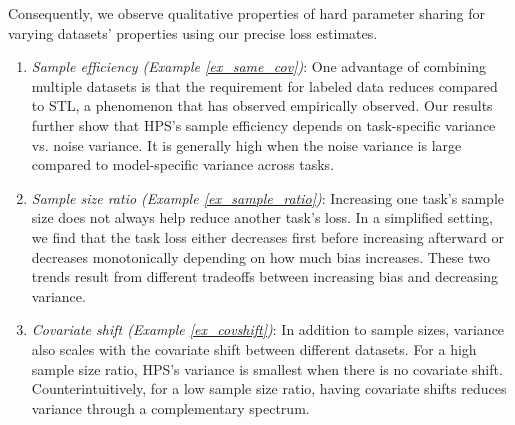 Consequently, we observe qualitative properties of hard parameter sharing for varying datasets' properties using our precise loss estimates.
\begin{enumerate}
	\item \textit{Sample efficiency (Example \ref{ex_same_cov})}:
	One advantage of combining multiple datasets is that the requirement for labeled data reduces compared to STL, a phenomenon that \citet{ZSSGM18} has observed empirically observed.
	Our results further show that HPS's sample efficiency depends on task-specific variance vs. noise variance. It is generally high when the noise variance is large compared to model-specific variance across tasks.
	\item \textit{Sample size ratio (Example \ref{ex_sample_ratio})}: Increasing one task's sample size does not always help reduce another task's loss. In a simplified setting, we find that the task loss either decreases first before increasing afterward or decreases monotonically depending on how much bias increases. These two trends result from different tradeoffs between increasing bias and decreasing variance.
	\item \textit{Covariate shift (Example \ref{ex_covshift})}: In addition to sample sizes, variance also scales with the covariate shift between different datasets. For a high sample size ratio, HPS's  variance is smallest when there is no covariate shift. Counterintuitively, for a low sample size ratio, having covariate shifts reduces variance through a complementary spectrum.
\end{enumerate}



